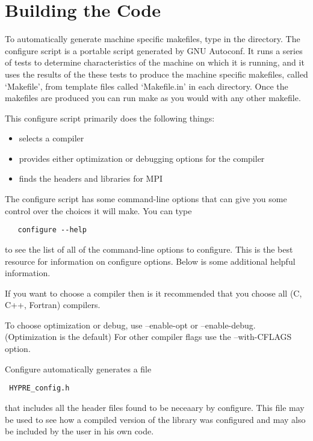 \chapter{Building the Code}
\label{Building the Code}

To automatically generate machine specific makefiles, type
 in the  directory.  The configure
script is a portable script generated by GNU Autoconf.  It runs a
series of tests to determine characteristics of the machine on which
it is running, and it uses the results of the these tests to produce
the machine specific makefiles, called `Makefile', from template files
called `Makefile.in' in each directory.  Once the makefiles are
produced you can run make as you would with any other makefile.

This configure script primarily does the following things:
\begin{itemize}
\item selects a compiler
\item provides either optimization or debugging options for the compiler
\item finds the headers and libraries for MPI
\end{itemize}

The configure script has some command-line options that can give you
some control over the choices it will make.  You can type
\begin{verbatim}
   configure --help
\end{verbatim}
to see the list of all of the command-line options to configure. This is
the best resource for information on configure options.  Below is some
additional helpful information.


\begin{description}

\item[Compilers] If you want to choose a compiler then is it recommended
that you choose all (C, C++, Fortran) compilers.

\item[Compiler Flags] To choose optimization or debug, use --enable-opt
or --enable-debug.  (Optimization is the default)  For other compiler 
flags use the --with-CFLAGS option.  

\item

\end{description}


Configure automatically generates a file 
\begin{verbatim} HYPRE_config.h \end{verbatim}that includes all the
header files found to be neceaary by configure.  This file may be used
to see how a compiled version of the library was configured and may also
be included by the user in his own code.
